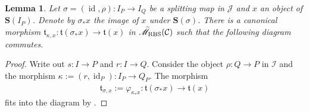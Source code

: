 \documentclass[12pt, reqno]{amsart}
\theoremstyle{plain}
\newtheorem{lemma}[theorem]{Lemma}
\theoremstyle{definition}
\renewcommand{\phi}{\varphi}
\begin{document}
\begin{lemma}
Let $\sigma=(\operatorname{id},\rho)\colon I_P\rightarrow I_Q$ be a splitting map in $\mathcal{J}$ and $x$ an object of $\mathbf{S}(I_P)$. Denote by $\sigma_*x$ the image of $x$ under $\mathbf{S}(\sigma)$. There is a canonical morphism $\mathfrak{t}_{\kappa,x}\colon \mathfrak{t}(\sigma_*x)\rightarrow \mathfrak{t}(x)$ in $\accentset{\sim}{\mathscr{M}}_{\operatorname{RBS}}(\mathcal{C})$ such that the following diagram commutes.
\begin{center}
\end{center}
\end{lemma}
\begin{proof}
Write out $s\colon I\rightarrow P$ and $r\colon I\rightarrow Q$. Consider the object $\rho\colon Q\rightarrow P$ in $\mathcal{I}$ and the morphism $\kappa:=(r,\operatorname{id}_P)\colon I_P\rightarrow Q_P$. The morphism
\begin{align*}
\mathfrak{t}_{\sigma,x}:=\phi_{\kappa_*x}\colon \mathfrak{t}(\sigma_*x)\rightarrow \mathfrak{t}(x)
\end{align*}
fits into the diagram by .
\end{proof}
\end{document}

